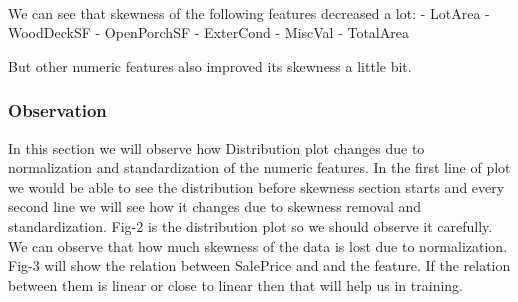 \documentclass[11pt, a4paper , landscape]{article}
\begin{document}
    \begin{center}
    \end{center}
    { \hspace*{\fill} \\}
    
    We can see that skewness of the following features decreased a lot: -
LotArea - WoodDeckSF - OpenPorchSF - ExterCond - MiscVal - TotalArea

But other numeric features also improved its skewness a little bit.

    \subsubsection{Observation}\label{observation}

In this section we will observe how Distribution plot changes due to
normalization and standardization of the numeric features. In the first
line of plot we would be able to see the distribution before skewness
section starts and every second line we will see how it changes due to
skewness removal and standardization. Fig-2 is the distribution plot so
we should observe it carefully. We can observe that how much skewness of
the data is lost due to normalization. Fig-3 will show the relation
between SalePrice and and the feature. If the relation between them is
linear or close to linear then that will help us in training.
\end{document}
